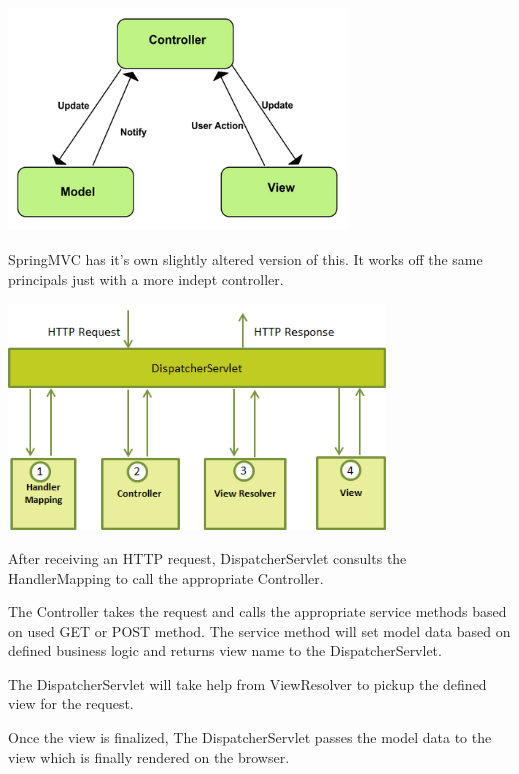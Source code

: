 \begin{center}    
   	\includegraphics[height=6cm, width=9cm]{img/mvc.png}
\end{center}

SpringMVC has it's own slightly altered version of this. It works off the same principals just with a more indept controller.

\begin{center}    
	\includegraphics[height=6cm, width=10cm]{img/springmvc.png}
\end{center}

\noindent After receiving an HTTP request, DispatcherServlet consults the HandlerMapping to call the appropriate Controller. \newline

\noindent The Controller takes the request and calls the appropriate service methods based on used GET or POST method. The service method will set model data based on defined business logic and returns view name to the DispatcherServlet. \newline

\noindent The DispatcherServlet will take help from ViewResolver to pickup the defined view for the request. \newline 

\noindent Once the view is finalized, The DispatcherServlet passes the model data to the view which is finally rendered on the browser. \newline

